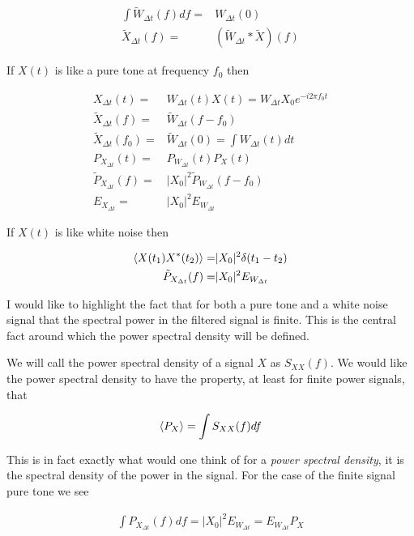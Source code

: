 \documentclass[12pt]{article}
\begin{document}
\begin{align}
\int \tilde{W}_{\Delta t}(f) df =& W_{\Delta t}(0) \\
\tilde{X}_{\Delta t}(f) =& (\tilde{W}_{\Delta t} \ast \tilde{X})(f)
\end{align}

If $X(t)$ is like a pure tone at frequency $f_0$ then

\begin{align}
X_{\Delta t}(t) =& W_{\Delta t}(t) X(t) = W_{\Delta t}X_0 e^{-i2\pi f_0 t}\\
\tilde{X}_{\Delta t}(f) =& \tilde{W}_{\Delta t}(f-f_0)\\
\tilde{X}_{\Delta t}(f_0) =& \tilde{W}_{\Delta t}(0) = \int W_{\Delta t}(t) dt\\
P_{X_{\Delta t}}(t) =& P_{W_{\Delta t}}(t) P_X(t)\\
\tilde{P}_{X_{\Delta t}}(f) =& |X_0|^2 \tilde{P}_{W_{\Delta t}}(f-f_0)\\
E_{X_{\Delta t}} =& |X_0|^2 E_{W_{\Delta t}}
\end{align}

If $X(t)$ is like white noise then

\begin{align}
\Braket{X(t_1)X^*(t_2)} =& |X_0|^2\delta(t_1-t_2)\\
\tilde{P}_{X_{\Delta t}}(f) =& |X_0|^2E_{W_{\Delta t}}
\end{align}

I would like to highlight the fact that for both a pure tone and a white noise signal that the spectral power in the filtered signal is finite.
This is the central fact around which the power spectral density will be defined.

We will call the power spectral density of a signal $X$ as $S_{XX}(f)$. 
We would like the power spectral density to have the property, at least for finite power signals, that

\begin{align}
\Braket{P_X} = \int S_{XX}(f) df
\end{align}

This is in fact exactly what would one think of for a \textit{power spectral density}, it is the spectral density of the power in the signal.
For the case of the finite signal pure tone we see

\begin{align}
\int P_{X_{\Delta t}}(f) df = |X_0|^2 E_{W_{\Delta t}} = E_{W_{\Delta t}} P_X
\end{align}
\end{document}
